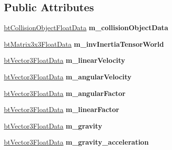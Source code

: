 \subsection*{Public Attributes}
\begin{DoxyCompactItemize}
\item 
\mbox{\label{structbtRigidBodyFloatData_aab4770d4083286ec5697d7cbd1f021ac}} 
\hyperlink{structbtCollisionObjectFloatData}{bt\+Collision\+Object\+Float\+Data} {\bfseries m\+\_\+collision\+Object\+Data}
\item 
\mbox{\label{structbtRigidBodyFloatData_a7aca5eb018e0e44b07c28111efb621e9}} 
\hyperlink{structbtMatrix3x3FloatData}{bt\+Matrix3x3\+Float\+Data} {\bfseries m\+\_\+inv\+Inertia\+Tensor\+World}
\item 
\mbox{\label{structbtRigidBodyFloatData_aae7a586338bd20de882f27d7aba4f98a}} 
\hyperlink{structbtVector3FloatData}{bt\+Vector3\+Float\+Data} {\bfseries m\+\_\+linear\+Velocity}
\item 
\mbox{\label{structbtRigidBodyFloatData_a5ea4faef95027f2138f2b1e1e457b1d3}} 
\hyperlink{structbtVector3FloatData}{bt\+Vector3\+Float\+Data} {\bfseries m\+\_\+angular\+Velocity}
\item 
\mbox{\label{structbtRigidBodyFloatData_a7034673a381aeebd2d4c18bdb875cdbd}} 
\hyperlink{structbtVector3FloatData}{bt\+Vector3\+Float\+Data} {\bfseries m\+\_\+angular\+Factor}
\item 
\mbox{\label{structbtRigidBodyFloatData_a46c7f71150ffd3a6c3b9402d49a09822}} 
\hyperlink{structbtVector3FloatData}{bt\+Vector3\+Float\+Data} {\bfseries m\+\_\+linear\+Factor}
\item 
\mbox{\label{structbtRigidBodyFloatData_ac1c2035cafc3483b1988acb706135b9f}} 
\hyperlink{structbtVector3FloatData}{bt\+Vector3\+Float\+Data} {\bfseries m\+\_\+gravity}
\item 
\mbox{\label{structbtRigidBodyFloatData_ae923d3948c233d03f576ca98f8ae753d}} 
\hyperlink{structbtVector3FloatData}{bt\+Vector3\+Float\+Data} {\bfseries m\+\_\+gravity\+\_\+acceleration}

\end{DoxyCompactItemize}
